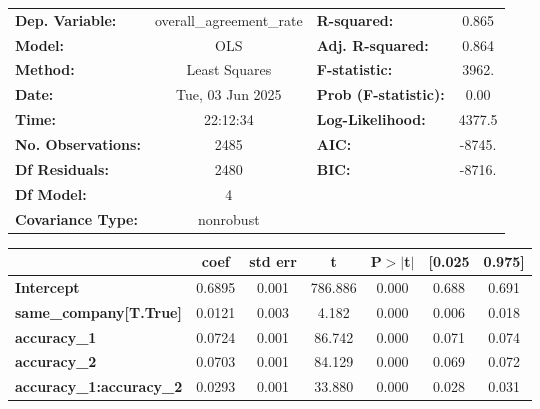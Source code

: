 \begin{center}
\begin{tabular}{lclc}
\toprule
\textbf{Dep. Variable:}          & overall\_agreement\_rate & \textbf{  R-squared:         } &     0.865   \\
\textbf{Model:}                  &           OLS            & \textbf{  Adj. R-squared:    } &     0.864   \\
\textbf{Method:}                 &      Least Squares       & \textbf{  F-statistic:       } &     3962.   \\
\textbf{Date:}                   &     Tue, 03 Jun 2025     & \textbf{  Prob (F-statistic):} &     0.00    \\
\textbf{Time:}                   &         22:12:34         & \textbf{  Log-Likelihood:    } &    4377.5   \\
\textbf{No. Observations:}       &            2485          & \textbf{  AIC:               } &    -8745.   \\
\textbf{Df Residuals:}           &            2480          & \textbf{  BIC:               } &    -8716.   \\
\textbf{Df Model:}               &               4          & \textbf{                     } &             \\
\textbf{Covariance Type:}        &        nonrobust         & \textbf{                     } &             \\
\bottomrule
\end{tabular}
\begin{tabular}{lcccccc}
                                 & \textbf{coef} & \textbf{std err} & \textbf{t} & \textbf{P$> |$t$|$} & \textbf{[0.025} & \textbf{0.975]}  \\
\midrule
\textbf{Intercept}               &       0.6895  &        0.001     &   786.886  &         0.000        &        0.688    &        0.691     \\
\textbf{same\_company[T.True]}   &       0.0121  &        0.003     &     4.182  &         0.000        &        0.006    &        0.018     \\
\textbf{accuracy\_1}             &       0.0724  &        0.001     &    86.742  &         0.000        &        0.071    &        0.074     \\
\textbf{accuracy\_2}             &       0.0703  &        0.001     &    84.129  &         0.000        &        0.069    &        0.072     \\
\textbf{accuracy\_1:accuracy\_2} &       0.0293  &        0.001     &    33.880  &         0.000        &        0.028    &        0.031     \\

\end{tabular}
\end{center}
